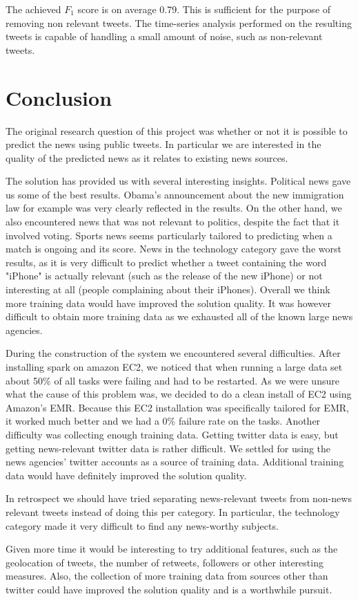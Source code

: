 \documentclass{llncs}
\begin{document}
The achieved $F_1$ score is on average 0.79. This is sufficient for the purpose of removing non relevant tweets. The time-series analysis performed on the resulting tweets is capable of handling a small amount of noise, such as non-relevant tweets.

\section{Conclusion}
The original research question of this project was whether or not it is possible to predict the news using public tweets. In particular we are interested in the quality of the predicted news as it relates to existing news sources.

The solution has provided us with several interesting insights. Political news gave us some of the best results. Obama's announcement about the new immigration law for example was very clearly reflected in the results. On the other hand, we also encountered news that was not relevant to politics, despite the fact that it involved voting. Sports news seems particularly tailored to predicting when a match is ongoing and its score. News in the technology category gave the worst results, as it is very difficult to predict whether a tweet containing the word "iPhone" is actually relevant (such as the release of the new iPhone) or not interesting at all (people complaining about their iPhones). Overall we think more training data would have improved the solution quality. It was however difficult to obtain more training data as we exhausted all of the known large news agencies.

During the construction of the system we encountered several difficulties. After installing spark on amazon EC2, we noticed that when running a large data set about 50\% of all tasks were failing and had to be restarted. As we were unsure what the cause of this problem was, we decided to do a clean install of EC2 using Amazon's EMR. Because this EC2 installation was specifically tailored for EMR, it worked much better and we had a 0\% failure rate on the tasks. Another difficulty was collecting enough training data. Getting twitter data is easy, but getting news-relevant twitter data is rather difficult. We settled for using the news agencies' twitter accounts as a source of training data. Additional training data would have definitely improved the solution quality.

In retrospect we should have tried separating news-relevant tweets from non-news relevant tweets instead of doing this per category. In particular, the technology category made it very difficult to find any news-worthy subjects.

Given more time it would be interesting to try additional features, such as the geolocation of tweets, the number of retweets, followers or other interesting measures. Also, the collection of more training data from sources other than twitter could have improved the solution quality and is a worthwhile pursuit.



\end{document}

